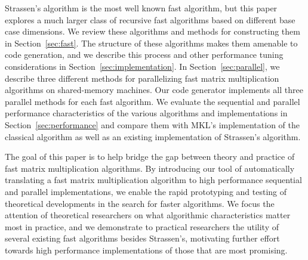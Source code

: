 \documentclass[preprint]{sigplanconf}
\begin{document}
Strassen's algorithm is the most well known fast algorithm, but this paper explores a much larger class of recursive fast algorithms based on different base case dimensions.
We review these algorithms and methods for constructing them in Section~\ref{sec:fast}.
The structure of these algorithms makes them amenable to code generation, and we describe this process and other performance tuning considerations in Section~\ref{sec:implementation}.
In Section~\ref{sec:parallel}, we describe three different methods for parallelizing fast matrix multiplication algorithms on shared-memory machines.
Our code generator implements all three parallel methods for each fast algorithm.
We evaluate the sequential and parallel performance characteristics of the various algorithms and implementations in Section~\ref{sec:performance} and compare them with MKL's implementation of the classical algorithm as well as an existing implementation of Strassen's algorithm.

The goal of this paper is to help bridge the gap between theory and practice of fast matrix multiplication algorithms.
By introducing our tool of automatically translating a fast matrix multiplication algorithm to high performance sequential and parallel implementations, we enable the rapid prototyping and testing of theoretical developments in the search for faster algorithms.
We focus the attention of theoretical researchers on what algorithmic characteristics matter most in practice, and we demonstrate to practical researchers the utility of several existing fast algorithms besides Strassen's, motivating further effort towards high performance implementations of those that are most promising.
\end{document}
